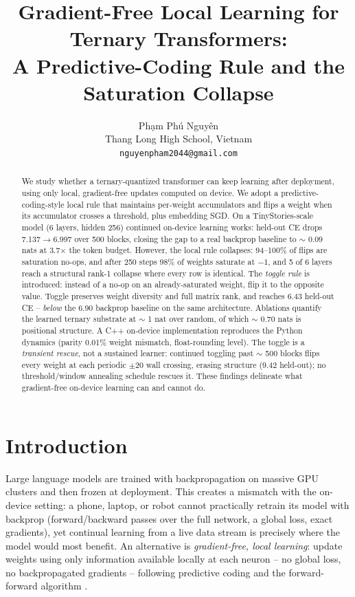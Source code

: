 \documentclass{article} %
\title{Gradient-Free Local Learning for Ternary Transformers:\\ A Predictive-Coding Rule and the Saturation Collapse}
\author{Ph\d{a}m Ph\'u Nguy\^en \\[0.3em]Thang Long High School, Vietnam \\
\texttt{nguyenpham2044@gmail.com}
}
\begin{document}
\maketitle

\lhead{}

\begin{abstract}
We study whether a ternary-quantized transformer can keep learning after deployment, using only local, gradient-free updates computed on device. We adopt a predictive-coding-style local rule that maintains per-weight accumulators and flips a weight when its accumulator crosses a threshold, plus embedding SGD. On a TinyStories-scale model (6 layers, hidden 256) continued on-device learning works: held-out CE drops 7.137$\rightarrow$6.997 over 500 blocks, closing the gap to a real backprop baseline to $\sim$ 0.09 nats at 3.7$\times$ the token budget. However, the local rule collapses: 94--100\% of flips are saturation no-ops, and after 250 steps 98\% of weights saturate at $-1$, and 5 of 6 layers reach a structural rank-1 collapse where every row is identical. The \emph{toggle rule} is introduced: instead of a no-op on an already-saturated weight, flip it to the opposite value. Toggle preserves weight diversity and full matrix rank, and reaches 6.43 held-out CE -- \emph{below} the 6.90 backprop baseline on the same architecture. Ablations quantify the learned ternary substrate at $\sim$ 1 nat over random, of which $\sim$ 0.70 nats is positional structure. A C++ on-device implementation reproduces the Python dynamics (parity 0.01\% weight mismatch, float-rounding level). The toggle is a \emph{transient rescue}, not a sustained learner: continued toggling past $\sim$ 500 blocks flips every weight at each periodic $\pm$20 wall crossing, erasing structure (9.42 held-out); no threshold/window annealing schedule rescues it. These findings delineate what gradient-free on-device learning can and cannot do.
\end{abstract}

\section{Introduction}
\label{sec:intro}

Large language models are trained with backpropagation on massive GPU clusters and then frozen at deployment. This creates a mismatch with the on-device setting: a phone, laptop, or robot cannot practically retrain its model with backprop (forward/backward passes over the full network, a global loss, exact gradients), yet continual learning from a live data stream is precisely where the model would most benefit. An alternative is \emph{gradient-free, local learning}: update weights using only information available locally at each neuron -- no global loss, no backpropagated gradients -- following predictive coding \citep{rao1999predictive,whittington2017approximation,millidge2020predictive} and the forward-forward algorithm \citep{hinton2022forward}.
\end{document}
